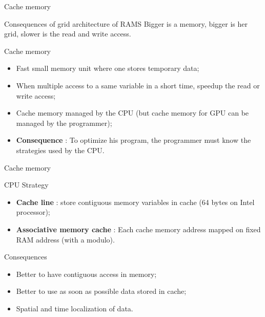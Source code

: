 \documentclass[compress,10pt,aspectratio=169]{beamer}
\begin{document}
\begin{frame}[fragile]{Cache memory}
    \begin{block}{Consequences of grid architecture of RAMS}
        Bigger is a memory, bigger is her grid, slower is the read and write access.
    \end{block}

    \begin{exampleblock}{Cache memory}
        \begin{itemize}
            \item Fast small memory unit where one stores temporary data;
            \item When multiple access to a same variable \alert{in a short time}, speedup the read or write access;
            \item Cache memory managed by the CPU (but cache memory for GPU can be managed by the programmer);
            \item \textbf{Consequence} : To optimize his program, the programmer must know the strategies used by the CPU.
        \end{itemize}
    \end{exampleblock}
\end{frame}


\begin{frame}[fragile]{Cache memory}
    \begin{block}{CPU Strategy}
        \begin{itemize}
            \item \textbf{Cache line} : store contiguous memory variables in cache (64 bytes on Intel processor);
            \item \textbf{Associative memory cache} : Each cache memory address mapped on fixed RAM address (with a modulo).
        \end{itemize}
    \end{block}

    \begin{alertblock}{Consequences}
        \begin{itemize}
            \item Better to have contiguous access in memory;
            \item Better to use as soon as possible data stored in cache;
            \item \alert{Spatial and time localization of data}.
        \end{itemize}
    \end{alertblock}
\end{frame}
\end{document}
